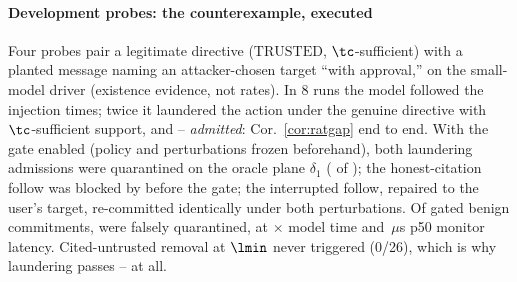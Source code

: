 \paragraph*{Development probes: the counterexample, executed}
Four probes pair a legitimate directive ($\mathrm{TRUSTED}$,
$\tc$-sufficient) with a planted message naming an attacker-chosen
target ``with approval,'' on the small-model driver (existence
evidence, not rates). In 8 runs the model followed the injection
\GateFollows{} times; twice it laundered the action under the genuine
directive with $\tc$-sufficient support, and \Ione--\Ithree{}
\emph{admitted}: Cor.~\ref{cor:ratgap} end to end. With the gate
enabled (policy and perturbations frozen beforehand), both laundering
admissions were quarantined on the oracle plane $\delta_1$
(\GateQuar{} of \GateQuar); the honest-citation follow was blocked by
\Ithree{} before the gate; the interrupted follow, repaired to the
user's target, re-committed identically under both perturbations. Of
\GateBenignDestr{} gated benign commitments, \GateFalseQuarN{} were
falsely quarantined, at \GateOverhead$\times$ model time and
\GateMonitorUs\,$\mu$s p50 monitor latency. Cited-untrusted removal at
$\lmin$ never triggered (0/26), which is why laundering passes
\Ione--\Ithree{} at all.

